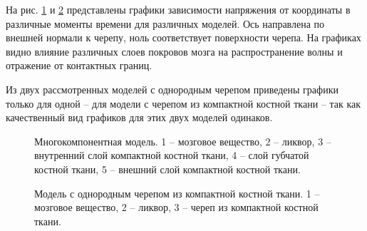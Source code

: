 На рис. \ref{pic:cranium_model1_1d} и \ref{pic:cranium_model2_1d} представлены графики зависимости напряжения от координаты в различные моменты времени для различных моделей. Ось направлена по внешней нормали к черепу, ноль соответствует поверхности черепа. На графиках видно влияние различных слоев покровов мозга на распространение волны и отражение от контактных границ. 

Из двух рассмотренных моделей с однородным черепом приведены графики только для одной -- для модели с черепом из компактной костной ткани -- так как качественный вид графиков для этих двух моделей одинаков. 

\begin{figure}[h]
\caption{Многокомпонентная модель. 1 -- мозговое вещество, 2 -- ликвор, 3 -- внутренний слой компактной костной ткани, 4 -- слой губчатой костной ткани, 5 -- внешний слой компактной костной ткани.}
\label{pic:cranium_model1_1d}
\end{figure}

\begin{figure}[h]
\caption{Модель с однородным черепом из компактной костной ткани. 1 -- мозговое вещество, 2 -- ликвор, 3 -- череп из компактной костной ткани.}
\label{pic:cranium_model2_1d}
\end{figure}

